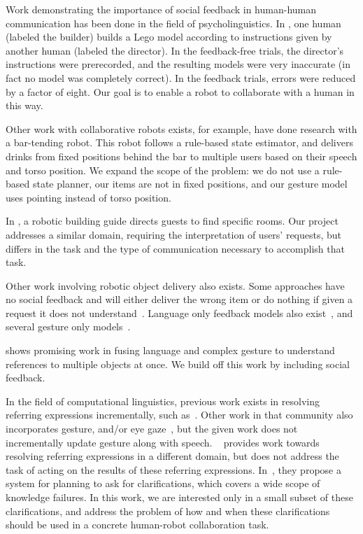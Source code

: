 \documentclass[conference]{IEEEtran}
\begin{document}
Work demonstrating the importance of social feedback in human-human
communication has been done in the field of psycholinguistics. In  \cite{clark04}, one human (labeled the builder)
builds a Lego model according to instructions given by another human
(labeled the director). In the feedback-free trials, the director's
instructions were prerecorded, and the resulting models were very
inaccurate (in fact no model was completely correct). In the feedback
trials, errors were reduced by a factor of eight. Our goal is to
enable a robot to collaborate with a human in this way.


Other work with collaborative robots exists, for example, \cite{foster12} have done research with a bar-tending robot. This robot follows a rule-based state estimator, and delivers drinks from fixed positions behind the bar to multiple users based on their speech and torso position. 
We expand the scope of the problem: we do not use a rule-based state planner, our items are not in fixed positions, and our gesture model uses pointing instead of torso position. 

In \cite{bohus14},  a robotic building guide directs guests to find specific rooms. Our project addresses a similar domain, requiring the interpretation of users' requests, but differs in the task and the type of communication necessary to accomplish that task. 

Other work involving robotic object delivery also exists. Some approaches have no social feedback and will either deliver the wrong item or do nothing if given a
request it does not understand~\citep{tellex11,matuszek12,tellex12,misra14}. Language only feedback models also 
exist~\citep{chai14,macmahon06,tellex11,matuszek12,guadarrama14,hewlett11,misra14}, and several gesture only models~\citep{waldherr00,marge11}.


\cite{matuszek14} shows promising work in fusing language and complex gesture to understand references to multiple objects at once. We build off this work by including social feedback. 

In the field of computational linguistics, previous work exists in resolving referring expressions incrementally, such as~\cite{schlangen09,Zender2008Conceptual,Gieselmann}. Other work in that community also incorporates gesture, and/or eye gaze~\citep{kennington13,kennington15a}, but the given work does not incrementally update gesture along with speech. ~\cite{chairmi} provides work towards resolving referring expressions in a different domain, but does not address the task of acting on the results of these referring expressions. In~\cite{kruijffclarification}, they propose a system for planning to ask for clarifications, which covers a wide scope of knowledge failures. In this work, we are interested only in a small subset of these clarifications, and address the problem of how and when these clarifications should be used in a concrete human-robot collaboration task. 
\end{document}
